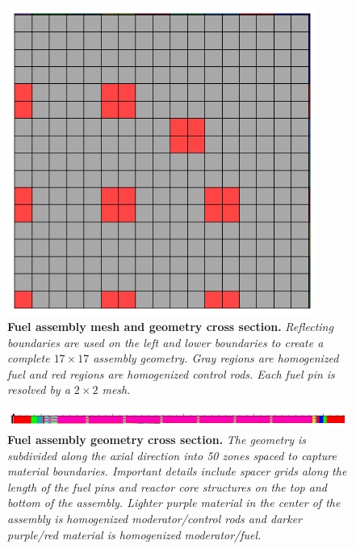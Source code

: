 \begin{figure}[t!]
  \begin{center}
    \includegraphics[width=4in]{chapters/spn_equations/problem3_radial_mat.png}
  \end{center}
  \caption{\textbf{Fuel assembly mesh and geometry cross section.}
    \textit{Reflecting boundaries are used on the left and lower
      boundaries to create a complete $17 \times 17$ assembly
      geometry. Gray regions are homogenized fuel and red regions are
      homogenized control rods. Each fuel pin is resolved by a $2
      \times 2$ mesh.}}
  \label{fig:problem3_radial_mat}
\end{figure}
\begin{figure}[t!]
  \begin{center}
    \includegraphics[width=6.0in]{chapters/spn_equations/problem3_axial_mat.png}
  \end{center}
  \caption{\textbf{Fuel assembly geometry cross section.} \textit{The
      geometry is subdivided along the axial direction into 50 zones
      spaced to capture material boundaries. Important details include
      spacer grids along the length of the fuel pins and reactor core
      structures on the top and bottom of the assembly. Lighter purple
      material in the center of the assembly is homogenized
      moderator/control rods and darker purple/red material is
      homogenized moderator/fuel.}}
  \label{fig:problem3_axial_mat}
\end{figure}
